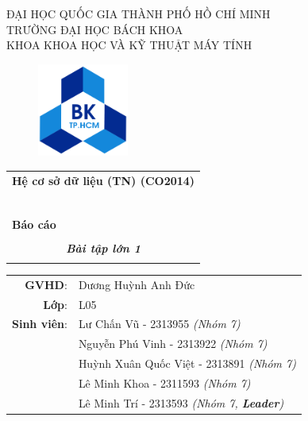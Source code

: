 \documentclass[a4paper]{article}
\begin{document}
\begin{titlepage}
	\begin{center}
		ĐẠI HỌC QUỐC GIA THÀNH PHỐ HỒ CHÍ MINH\\
		TRƯỜNG ĐẠI HỌC BÁCH KHOA\\
		KHOA KHOA HỌC VÀ KỸ THUẬT MÁY TÍNH\\
	\end{center}

	\vspace{1cm}

	\begin{figure}[h!]
		\begin{center}
			\includegraphics[width=3cm]{Images/hcmut.png}
		\end{center}
	\end{figure}

	\vspace{1cm}


	\begin{center}
		\begin{tabular}{c}
			\multicolumn{1}{c}{\textbf{{\Large Hệ cơ sở dữ liệu (TN) (CO2014)}}} \\
			~~                                                                   \\
			\hline
			\\
			\multicolumn{1}{l}{\textbf{{\Large Báo cáo  }}}                       \\
			\\
			\textbf{\textit{{\Huge Bài tập lớn 1 }}}                          \\
			\\
			\hline
		\end{tabular}
	\end{center}

	\begin{table}[h]
		\centering
		\begin{tabular}{rl}
			\hspace{3 cm}\textbf{GVHD}:
			                    & Dương Huỳnh Anh Đức \\[8pt]

                    \textbf{Lớp}: & L05 \\ [8pt]
			\textbf{Sinh viên}: & Lư Chấn Vũ - 2313955 \emph{(Nhóm 7)} \\
			                    & Nguyễn Phú Vinh - 2313922 \emph{(Nhóm 7)}             \\
			                    & Huỳnh Xuân Quốc Việt - 2313891 \emph{(Nhóm 7)}        \\
			                    & Lê Minh Khoa - 2311593 \emph{(Nhóm 7)}                \\
			                    & Lê Minh Trí - 2313593 \emph{(Nhóm 7, \textbf{Leader})}           \\
		\end{tabular}
	\end{table}


\end{titlepage}
\end{document}
